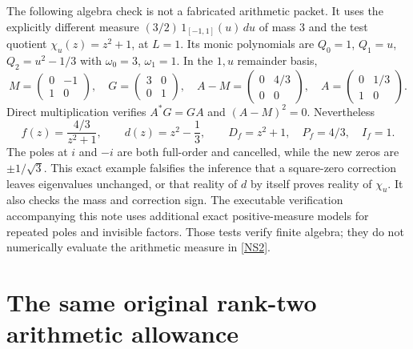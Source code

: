 \documentclass[11pt]{article}
\begin{document}
The following algebra check is not a fabricated arithmetic
packet. It uses the explicitly different measure
$(3/2)\,1_{[-1,1]}(u)\,du$ of mass $3$ and the test quotient
$\chi_u(z)=z^2+1$, at $L=1$. Its monic polynomials are
$Q_0=1$, $Q_1=u$, $Q_2=u^2-1/3$ with
$\omega_0=3$, $\omega_1=1$. In the $1,u$ remainder basis,
\begin{equation}\tag{NS33}\label{NS33}
M=\begin{pmatrix}0&-1\\1&0\end{pmatrix},\quad
G=\begin{pmatrix}3&0\\0&1\end{pmatrix},\quad
A-M=\begin{pmatrix}0&4/3\\0&0\end{pmatrix},\quad
A=\begin{pmatrix}0&1/3\\1&0\end{pmatrix}.
\end{equation}
Direct multiplication verifies $A^*G=GA$ and
$(A-M)^2=0$. Nevertheless
\begin{equation}\tag{NS34}\label{NS34}
f(z)=\frac{4/3}{z^2+1},\qquad
d(z)=z^2-\frac13,\qquad
D_f=z^2+1,\quad P_f=4/3,\quad I_f=1.
\end{equation}
The poles at $i$ and $-i$ are both full-order and
cancelled, while the new zeros are $\pm1/\sqrt3$.
This exact example falsifies the inference that a
square-zero correction leaves eigenvalues unchanged,
or that reality of $d$ by itself proves reality of
$\chi_u$. It also checks the mass and correction sign.
The executable verification accompanying this note
uses additional exact positive-measure models for
repeated poles and invisible factors. Those tests
verify finite algebra; they do not numerically
evaluate the arithmetic measure in \eqref{NS2}.

\section{The same original rank-two arithmetic allowance}
\end{document}
